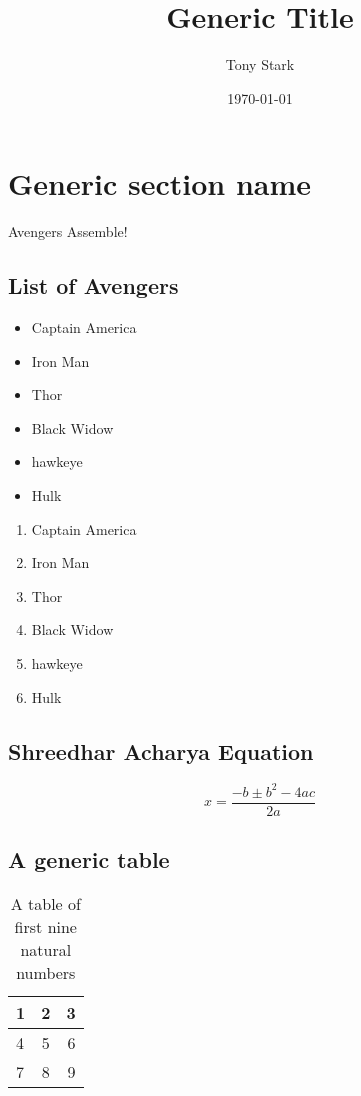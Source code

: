 \documentclass{article}
\title{Generic Title}
\author{Tony Stark}
\date{\today}
\begin{document}
\maketitle

\section{Generic section name}
	Avengers Assemble!

\subsection{List of Avengers}
\begin{itemize}
\item Captain America
\item Iron Man
\item Thor
\item Black Widow
\item hawkeye
\item Hulk
\end{itemize}

\begin{enumerate}
\item Captain America
\item Iron Man
\item Thor
\item Black Widow
\item hawkeye
\item Hulk

\end{enumerate}




\subsection{Shreedhar Acharya Equation}
\begin{equation}
	x=\frac{-b\pm b^2 - 4ac}{2a}
\end{equation}
\subsection{A generic table}

\begin{table}[h]
	\centering
	\begin{tabular}{| l | c | r |}
		\hline
		1 & 2 & 3\\
		\hline
		4 & 5 & 6\\
		\hline
		7 & 8 & 9\\
		\hline
	\end{tabular}
	\caption{A table of first nine natural numbers}
\end{table}
		 
\end{document}
